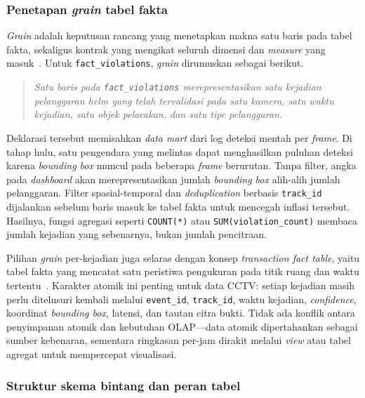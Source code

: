 \subsubsection{Penetapan \textit{grain} tabel fakta}

\textit{Grain} adalah keputusan rancang yang menetapkan makna satu baris pada tabel fakta, sekaligus kontrak yang mengikat seluruh dimensi dan \textit{measure} yang masuk~\cite{kimball_grain}. Untuk \texttt{fact\_violations}, \textit{grain} dirumuskan sebagai berikut.

\begin{quote}
\textit{Satu baris pada \texttt{fact\_violations} merepresentasikan satu kejadian pelanggaran helm yang telah tervalidasi pada satu kamera, satu waktu kejadian, satu objek pelacakan, dan satu tipe pelanggaran.}
\end{quote}

Deklarasi tersebut memisahkan \textit{data mart} dari log deteksi mentah per \textit{frame}. Di tahap hulu, satu pengendara yang melintas dapat menghasilkan puluhan deteksi karena \textit{bounding box} muncul pada beberapa \textit{frame} berurutan. Tanpa filter, angka pada \textit{dashboard} akan merepresentasikan jumlah \textit{bounding box} alih-alih jumlah pelanggaran. Filter spasial-temporal dan \textit{deduplication} berbasis \texttt{track\_id} dijalankan sebelum baris masuk ke tabel fakta untuk mencegah inflasi tersebut. Hasilnya, fungsi agregasi seperti \texttt{COUNT(*)} atau \texttt{SUM(violation\_count)} membaca jumlah kejadian yang sebenarnya, bukan jumlah pencitraan.

Pilihan \textit{grain} per-kejadian juga selaras dengan konsep \textit{transaction fact table}, yaitu tabel fakta yang mencatat satu peristiwa pengukuran pada titik ruang dan waktu tertentu~\cite{kimball_transaction_fact}. Karakter atomik ini penting untuk data CCTV: setiap kejadian masih perlu ditelusuri kembali melalui \texttt{event\_id}, \texttt{track\_id}, waktu kejadian, \textit{confidence}, koordinat \textit{bounding box}, latensi, dan tautan citra bukti. Tidak ada konflik antara penyimpanan atomik dan kebutuhan OLAP---data atomik dipertahankan sebagai sumber kebenaran, sementara ringkasan per-jam dirakit melalui \textit{view} atau tabel agregat untuk mempercepat visualisasi.

\subsubsection{Struktur skema bintang dan peran tabel}

